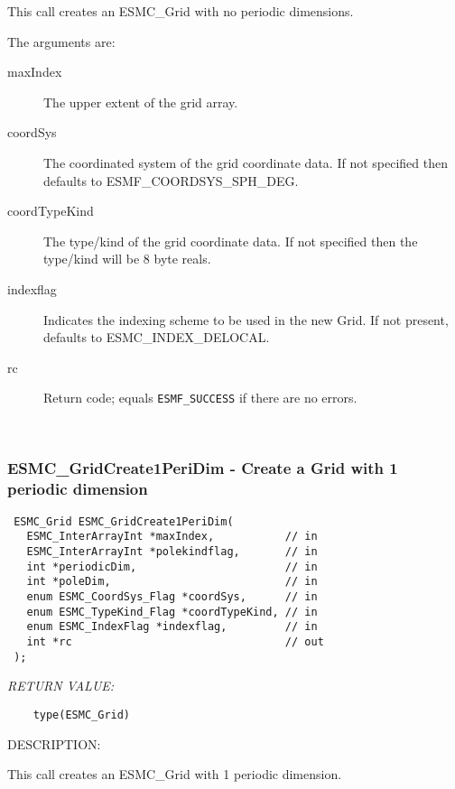   
    This call creates an ESMC\_Grid with no periodic dimensions.
  
    The arguments are:
    \begin{description}
    \item[maxIndex]
        The upper extent of the grid array.
    \item[coordSys]
        The coordinated system of the grid coordinate data. If not specified then
        defaults to ESMF\_COORDSYS\_SPH\_DEG.
    \item[coordTypeKind]
        The type/kind of the grid coordinate data.  If not specified then the
        type/kind will be 8 byte reals.
    \item[indexflag]
        Indicates the indexing scheme to be used in the new Grid. If not present,
        defaults to ESMC\_INDEX\_DELOCAL.
    \item[rc]
        Return code; equals {\tt ESMF\_SUCCESS} if there are no errors.
    \end{description}
   
 
\mbox{}\hrulefill\ 
 
\subsubsection [ESMC\_GridCreate1PeriDim] {ESMC\_GridCreate1PeriDim - Create a Grid with 1 periodic dimension}


  
\begin{verbatim} ESMC_Grid ESMC_GridCreate1PeriDim(
   ESMC_InterArrayInt *maxIndex,           // in
   ESMC_InterArrayInt *polekindflag,       // in
   int *periodicDim,                       // in
   int *poleDim,                           // in
   enum ESMC_CoordSys_Flag *coordSys,      // in
   enum ESMC_TypeKind_Flag *coordTypeKind, // in
   enum ESMC_IndexFlag *indexflag,         // in
   int *rc                                 // out
 );\end{verbatim}{\em RETURN VALUE:}
\begin{verbatim}    type(ESMC_Grid)\end{verbatim}
{\sf DESCRIPTION:\\ }


  
    This call creates an ESMC\_Grid with 1 periodic dimension.
  
